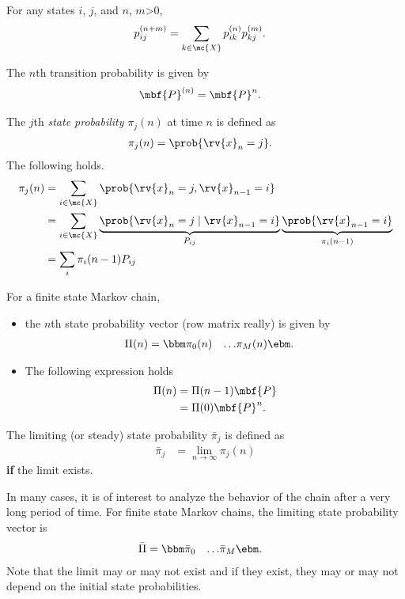 \begin{theoremBox}
     For any states $i$, $j$, and $n$, $m$>0, 
     \begin{align}
         p_{ij}^{(n+m)} &= \sum_{k\in\mc{X}} p_{ik}^{(n)}p_{kj}^{(m)}.
     \end{align}
\end{theoremBox}

\begin{remarkBox}
    The $n$th transition probability is given by
    \begin{align}
        \mbf{P}^{(n)} &= \mbf{P}^{n}.
    \end{align}
\end{remarkBox}

\begin{definitionBox}
    The $j$th \emph{state probability} $\pi_{j}(n)$ at time $n$ is defined as
    \begin{align}
        \pi_{j}(n) &= \prob{\rv{x}_{n} = j}.
    \end{align}
    The following holds.
    \begin{align}
        \pi_{j}(n) 
        &= \sum_{i\in\mc{X}} \prob{\rv{x}_{n}=j, \rv{x}_{n-1}=i}\\
        &= \sum_{i\in\mc{X}} \underbrace{\prob{\rv{x}_{n}=j \mid \rv{x}_{n-1}=i}}_{P_{ij}}\underbrace{\prob{\rv{x}_{n-1}=i}}_{\pi_{i}(n-1)}\\
        &= \sum_{i}\pi_{i}(n-1)P_{ij}
    \end{align}
\end{definitionBox}
For a finite state Markov chain, 
\begin{itemize}
    \item the $n$th state probability vector (row matrix really) is given by
    \begin{align}
        \Pi(n) &= \bbm \pi_{0}(n) & \ldots & \pi_{M}(n) \ebm.
    \end{align}
    \item The following expression holds
    \begin{align}
        \Pi(n) &= \Pi(n-1)\mbf{P}\\
        &= \Pi(0)\mbf{P}^{n}.
    \end{align}
\end{itemize}
\begin{definitionBox}
    The limiting (or steady) state probability $\bar{\pi}_{j}$ is defined as
    \begin{align}
        \bar{\pi}_{j} &= \lim_{n\to \infty}\pi_{j}(n)
    \end{align}
    \textbf{if} the limit exists.
\end{definitionBox}
In many cases, it is of interest to analyze the behavior of the chain after a very long period of time. For finite state Markov chains, the limiting state probability vector is
\begin{align}
    \bar{\Pi}&= \bbm \bar{\pi}_{0} & \ldots & \bar{\pi}_{M} \ebm.
\end{align}
Note that the limit may or may not exist and if they exist, they may or may not depend on the initial state probabilities.

